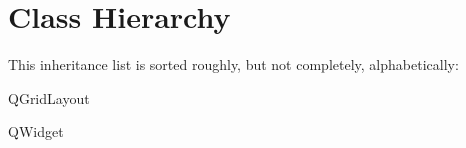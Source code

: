 \section{Class Hierarchy}
This inheritance list is sorted roughly, but not completely, alphabetically\+:\begin{DoxyCompactList}
\item {}
\begin{DoxyCompactList}
\item {}
\end{DoxyCompactList}
\item Q\+Grid\+Layout\begin{DoxyCompactList}
\item {}
\item {}
\end{DoxyCompactList}
\item Q\+Widget\begin{DoxyCompactList}
\item {}
\end{DoxyCompactList}
\item {}
\end{DoxyCompactList}
